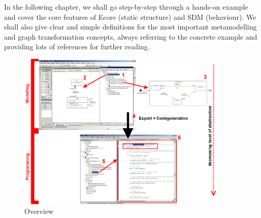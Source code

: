 In the following chapter, we shall go step-by-step through a hands-on example and cover the core features of Ecore (static structure) and SDM (behaviour). 
We shall also give clear and simple definitions for the most important metamodelling and graph transformation concepts, always referring to the concrete example and providing lots of references for further reading.

\begin{figure}[htbp]
	\centering
  \includegraphics[width=0.9\textwidth]{../installation_images/tafelbild}
	\caption{Overview}
	\label{fig_Overview}
\end{figure}